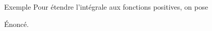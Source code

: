 \documentclass[9pt,t]{beamer}
\begin{document}
\begin{frame}{Exemple}
Pour étendre l'intégrale aux fonctions positives, on pose
\begin{definition}
  Énoncé.
\end{definition}
\end{frame}
\end{document}
